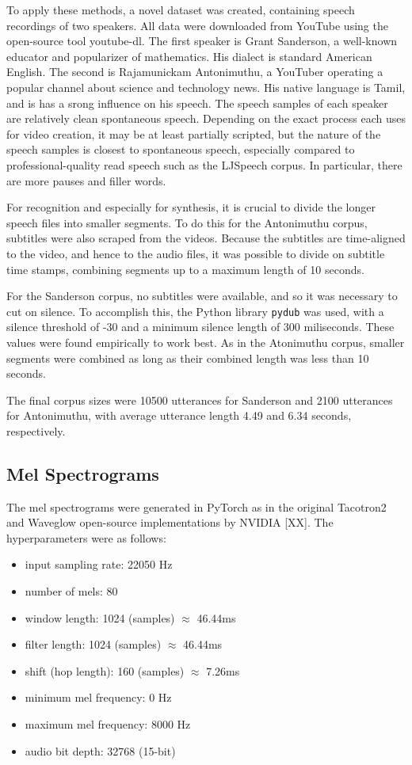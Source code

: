 To apply these methods, a novel dataset was created, containing speech recordings of two speakers. 
All data were downloaded from YouTube using the open-source tool youtube-dl.
The first speaker is Grant Sanderson, a well-known educator and popularizer of mathematics. His dialect is 
standard American English.
The second is Rajamunickam Antonimuthu, a YouTuber operating a popular channel about science 
and technology news. His native language is Tamil, and is has a srong influence on his speech.
The speech samples of each speaker are relatively clean spontaneous speech. Depending on the exact 
process each uses for video creation, it may be at least partially scripted, but the nature of the speech 
samples is closest to spontaneous speech, especially compared to professional-quality read speech such as 
the LJSpeech corpus. In particular, there are more pauses and filler words.

For recognition and especially for synthesis, it is crucial to divide the longer speech files into smaller 
segments. To do this for the Antonimuthu corpus, subtitles were also scraped from the videos.
Because the subtitles are time-aligned to the video, and hence to the audio files, it was possible to 
divide on subtitle time stamps, combining segments up to a maximum length of 10 seconds.

For the Sanderson corpus, no subtitles were available, and so it was necessary to cut on silence. 
To accomplish this, the Python library \texttt{pydub} was used, with a silence threshold of -30 and 
a minimum silence length of 300 miliseconds. These values were found empirically to work best. 
As in the Atonimuthu corpus, smaller segments were combined as long as their combined length was 
less than 10 seconds.

The final corpus sizes were 10500 utterances for Sanderson and 2100 utterances for Antonimuthu, with average 
utterance length 4.49 and 6.34 seconds, respectively.

\subsection{Mel Spectrograms}
The mel spectrograms were generated in PyTorch as in the original Tacotron2 and Waveglow 
open-source implementations by NVIDIA [XX]. The hyperparameters were as follows:
\begin{itemize}
 \item input sampling rate: 22050 Hz
 \item number of mels: 80
 \item window length: 1024 (samples) $\approx$ 46.44ms
 \item filter length: 1024 (samples) $\approx$ 46.44ms
 \item shift (hop length): 160 (samples) $\approx$ 7.26ms
 \item minimum mel frequency: 0 Hz 
 \item maximum mel frequency: 8000 Hz
 \item audio bit depth: 32768 (15-bit)
\end{itemize}

